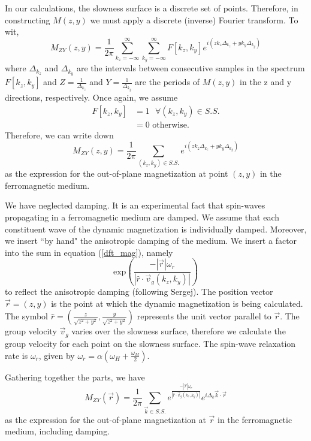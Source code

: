 \documentclass{article}
\begin{document}
In our calculations, the slowness surface is a discrete set of points. Therefore, in constructing $M(z,y)$ we must apply a discrete (inverse) Fourier transform. To wit,
\begin{equation}
M_{Z Y}(z,y) = \frac{1}{2\pi}\sum_{k_{z} = -\infty}^{\infty} \sum_{k_{y} = -\infty}^{\infty} F[k_{z},k_{y}] e^{i (z k_{z} \Delta_{k_{z}} + y k_{y} \Delta_{k_{y}})}
\end{equation}
where $\Delta_{k_{z}}$ and $\Delta_{k_{y}}$ are the intervals between consecutive samples in the spectrum $F[k_{z},k_{y}]$ and $Z = \frac{1}{\Delta_{k_{z}}}$ and $Y = \frac{1}{\Delta_{k_{y}}}$ are the periods of $M(z,y)$ in the z and y directions, respectively. 
Once again, we assume
\begin{align}
F[k_{z},k_{y}] &= 1 \text{  } \forall (k_{z},k_{y}) \in S.S. \\
&= 0 \text{ otherwise.} \nonumber
\end{align}
Therefore, we can write down 
\begin{equation}\label{dft_mag}
M_{Z Y}(z,y) = \frac{1}{2\pi}\sum_{(k_{z},k_{y}) \in S.S.} e^{i (z k_{z} \Delta_{k_{z}} + y k_{y} \Delta_{k_{y}})}
\end{equation}
as the expression for the out-of-plane magnetization at point $(z,y)$ in the ferromagnetic medium.

We have neglected damping. 
It is an experimental fact that spin-waves propagating in a ferromagnetic medium are damped. 
We assume that each constituent wave of the dynamic magnetization is individually damped. 
Moreover, we insert ``by hand" the anisotropic damping of the medium.
We insert a factor into the sum in equation (\ref{dft_mag}), namely
\begin{equation}
\text{exp}\left(\frac{-|\vec{r}| \omega_{r}}{|\hat{r} \cdot \vec{v}_{g}(k_{z},k_{y}) |}\right)
\end{equation}
to reflect the anisotropic damping (following Sergej). 
The position vector $\vec{r} = (z,y)$ is the point at which the dynamic magnetization is being calculated. 
The symbol $\hat{r} = \left(\frac{z}{\sqrt{z^2+y^2}},\frac{y}{\sqrt{z^2+y^2}}\right)$ represents the unit vector parallel to $\vec{r}$. 
The group velocity $\vec{v}_{g}$ varies over the slowness surface, therefore we calculate the group velocity for each point on the slowness surface.
The spin-wave relaxation rate is $\omega_{r}$, given by $\omega_{r} = \alpha (\omega_{H} + \frac{\omega_{M}}{2})$.

Gathering together the parts, we have
\begin{equation}
M_{Z Y}(\vec{r}) = \frac{1}{2\pi}\sum_{\vec{k} \in S.S.} e^{\frac{-|\vec{r}| \omega_{r}}{|\hat{r} \cdot \vec{v}_{g}(k_{z},k_{y}) |}}             e^{i \Delta_{k} \vec{k} \cdot \vec{r}}
\end{equation}
as the expression for the out-of-plane magnetization at $\vec{r}$ in the ferromagnetic medium, including damping.
\end{document}
